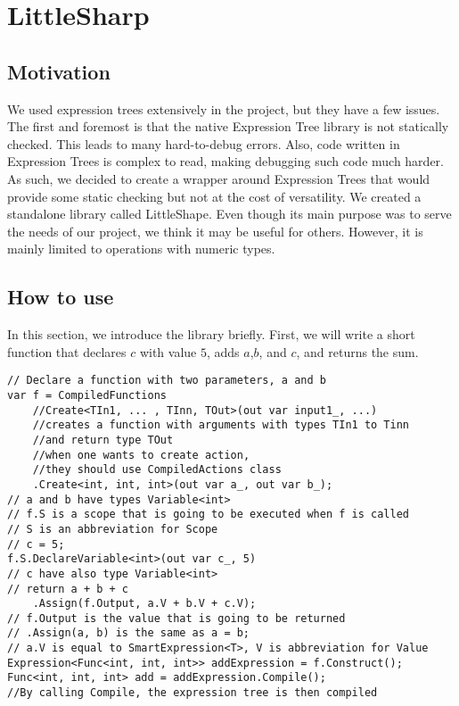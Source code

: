 \chapter{LittleSharp}
\section{Motivation}
We used expression trees extensively in the project, but they have a few issues. The first and foremost is that the native Expression Tree library is not statically checked. This leads to many hard-to-debug errors. Also, code written in Expression Trees is complex to read, making debugging such code much harder. As such, we decided to create a wrapper around Expression Trees that would provide some static checking but not at the cost of versatility. We created a standalone library called LittleShape. Even though its main purpose was to serve the needs of our project, we think it may be useful for others. However, it is mainly limited to operations with numeric types.  

\section{How to use}
In this section, we introduce the library briefly. First, we will write a short function that declares $c$ with value $5$, adds $a$,$b$, and $c$, and returns the sum.
\begin{lstlisting}
// Declare a function with two parameters, a and b
var f = CompiledFunctions
    //Create<TIn1, ... , TInn, TOut>(out var input1_, ...)
    //creates a function with arguments with types TIn1 to Tinn
    //and return type TOut
    //when one wants to create action,
    //they should use CompiledActions class
    .Create<int, int, int>(out var a_, out var b_);
// a and b have types Variable<int>
// f.S is a scope that is going to be executed when f is called
// S is an abbreviation for Scope
// c = 5; 
f.S.DeclareVariable<int>(out var c_, 5)
// c have also type Variable<int>
// return a + b + c
	.Assign(f.Output, a.V + b.V + c.V);
// f.Output is the value that is going to be returned
// .Assign(a, b) is the same as a = b;
// a.V is equal to SmartExpression<T>, V is abbreviation for Value
Expression<Func<int, int, int>> addExpression = f.Construct();
Func<int, int, int> add = addExpression.Compile();
//By calling Compile, the expression tree is then compiled 
\end{lstlisting}

